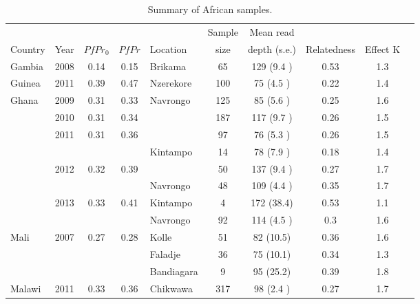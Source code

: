 \documentclass[9pt,lineno]{elife}
\begin{document}
\begin{table}[btp]
  \caption{Summary of African samples.}\label{tab:Pf3k}
{\small
\begin{tabular}{p{1.5cm} c c c |p{1.5cm} c c c c c}
\toprule
        &          &&&         & Sample & Mean read             & & &\\
Country &   Year   &$PfPr_{0}$&$PfPr$&Location & size   & depth (s.e.)  & Relatedness & Effect K&\\
\midrule
Gambia          &2008           &0.14  &0.15  &Brikama&65   &129  (9.4 )&0.53 &1.3  &\\
\hline
Guinea          &2011           &0.39  &0.47  &Nzerekore&100  &75   (4.5 )&0.22 &1.4  &\\
\hline
Ghana           &2009           &0.31  &0.33  &Navrongo&125  &85   (5.6 )&0.25 &1.6  &\\
                &2010           &0.31  &0.34  &               &187  &117  (9.7 )&0.26 &1.5  &\\
                &2011           &0.31  &0.36  &               &97   &76   (5.3 )&0.26 &1.5  &\\
                &               &               &               &Kintampo&14   &78   (7.9 )&0.18 &1.4  &\\
                &2012           &0.32  &0.39  &               &50   &137  (9.4 )&0.27 &1.7  &\\
                &               &               &               &Navrongo&48   &109  (4.4 )&0.35 &1.7  &\\
                &2013           &0.33  &0.41  &Kintampo&4    &172  (38.4)&0.53 &1.1  &\\
                &               &               &               &Navrongo&92   &114  (4.5 )&0.3  &1.6  &\\
\hline
Mali            &2007           &0.27  &0.28  &Kolle&51   &82   (10.5)&0.36 &1.6  &\\
                &               &               &               &Faladje&36   &75   (10.1)&0.34 &1.3  &\\
                &               &               &               &Bandiagara&9    &95   (25.2)&0.39 &1.8  &\\
\hline
Malawi          &2011           &0.33  &0.36  &Chikwawa&317  &98   (2.4 )&0.27 &1.7  &\\

\end{tabular}}
\end{table}
\end{document}
